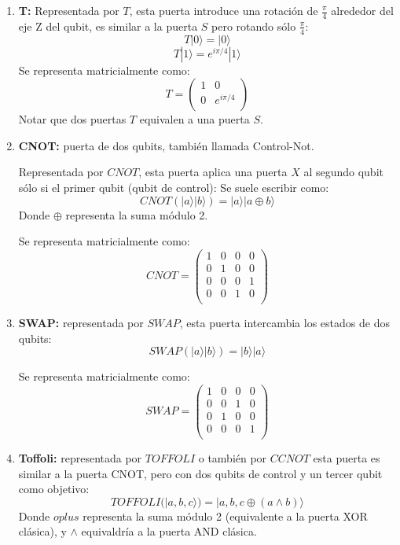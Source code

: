 \begin{enumerate}
    \item \textbf{T:} Representada por $T$, esta puerta introduce una rotación de $\frac{\pi}{4}$ alrededor del eje Z del qubit, es similar a la puerta $S$ pero rotando sólo $\frac{\pi}{4}$:
    $$T|0\rangle = |0\rangle$$
    $$T|1\rangle = e^{i\pi/4}|1\rangle$$
    Se representa matricialmente como:
    $$T=\begin{pmatrix}
        1 & 0 \\
        0 & e^{i\pi/4} \\
    \end{pmatrix}$$   
    Notar que dos puertas $T$ equivalen a una puerta $S$.   


    \item \textbf{CNOT:} puerta de dos qubits, también llamada Control-Not.
    
    Representada por $CNOT$, esta puerta aplica una puerta $X$ al segundo qubit sólo si el primer qubit (qubit de control):
    Se suele escribir como:
    $$CNOT(|a\rangle|b\rangle) = |a\rangle|a\oplus b\rangle$$
    Donde $\oplus$ representa la suma módulo 2.
    
    Se representa matricialmente como:
    $$CNOT=\begin{pmatrix}
        1 & 0 & 0 & 0\\
        0 & 1 & 0 & 0\\
        0 & 0 & 0 & 1\\
        0 & 0 & 1 & 0\\
    \end{pmatrix}$$   


    \item \textbf{SWAP:} representada por $SWAP$, esta puerta intercambia los estados de dos qubits:
    $$SWAP(|a\rangle|b\rangle) = |b\rangle|a\rangle$$
    
    Se representa matricialmente como:
    $$SWAP=\begin{pmatrix}
        1 & 0 & 0 & 0\\
        0 & 0 & 1 & 0\\
        0 & 1 & 0 & 0\\
        0 & 0 & 0 & 1\\
    \end{pmatrix}$$   

    \item \textbf{Toffoli:} representada por $TOFFOLI$ o también por $CCNOT$ esta puerta es similar a la puerta CNOT, pero con dos qubits de control y un tercer qubit como objetivo:
    $$TOFFOLI(|a,b,c\rangle) = |a,b,c \oplus (a\wedge b)\rangle$$
    Donde $oplus$ representa la suma módulo 2 (equivalente a la puerta XOR clásica), y $\wedge$ equivaldría a la puerta AND clásica.
    

\end{enumerate}

